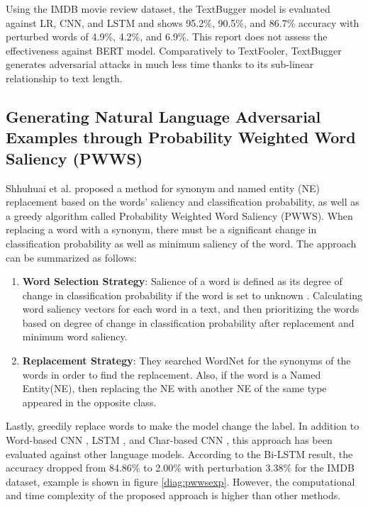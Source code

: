 \documentclass[%
	BCOR=8mm, %
	DIV=12,
	toc=bibliography, %
	toc=listof, %
	oneside, %
	egregdoesnotlikesansseriftitles, %
	]{scrbook}
\begin{document}
Using the IMDB movie review dataset, the TextBugger model is evaluated against LR, CNN, and LSTM and shows 95.2\%, 90.5\%, and 86.7\% accuracy with perturbed words of 4.9\%, 4.2\%, and 6.9\%. This report does not assess the effectiveness against BERT model. Comparatively to TextFooler, TextBugger generates adversarial attacks in much less time thanks to its sub-linear relationship to text length.

\subsection{Generating Natural Language Adversarial Examples through Probability Weighted Word Saliency (PWWS)}
\label{subsection:generatingadversarialexample}
Shhuhuai et al. \cite{ren_generating_2019} proposed a method for synonym and named entity (NE) replacement based on the words' saliency and classification probability, as well as a greedy algorithm called Probability Weighted Word Saliency (PWWS). When replacing a word with a synonym, there must be a significant change in classification probability as well as minimum saliency of the word. The approach can be summarized as follows:

\begin{enumerate}
    \item \textbf{Word Selection Strategy}:  
   Salience of a word is defined as its degree of change in classification probability if the word is set to unknown \cite{li_understanding_2017}. Calculating word saliency vectors for each word in a text, and then prioritizing the words based on degree of change in classification probability after replacement and minimum word saliency.
    \item \textbf{Replacement Strategy}: They searched WordNet for the synonyms of the words in order to find the replacement. Also, if the word is a Named Entity(NE), then replacing the NE with another NE of the same type appeared in the opposite class.
\end{enumerate}
Lastly, greedily replace words to make the model change the label. In addition to Word-based CNN \cite{kim_convolutional_2014},  LSTM \cite{hochreiter_long_1997},  and Char-based CNN \cite{zhang_character-level_2016}, this approach has been evaluated against other language models. According to the Bi-LSTM result, the accuracy dropped from 84.86\% to 2.00\% with perturbation 3.38\% for the IMDB dataset, example is shown in figure \ref{diag:pwwsexp}. However, the computational and time complexity of the proposed approach is higher than other methods.
\end{document}

